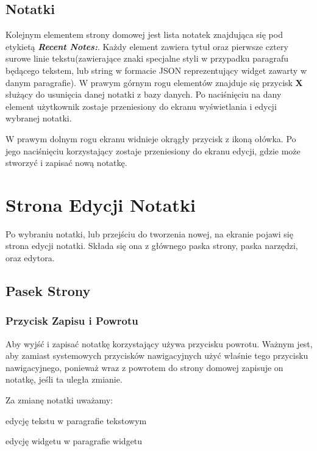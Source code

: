 \documentclass[shortabstract]{iithesis}
\begin{document}
\subsection{Notatki}

Kolejnym elementem strony domowej jest lista notatek znajdująca się pod etykietą \textbf{\textit{Recent Notes:}}. Każdy element zawiera tytuł oraz pierwsze cztery surowe linie tekstu(zawierające znaki specjalne styli w przypadku paragrafu będącego tekstem, lub string w formacie JSON reprezentujący widget zawarty w danym paragrafie).
W prawym górnym rogu elementów znajduje się przycisk \textbf{X} służący do usunięcia danej notatki z bazy danych.
Po naciśnięciu na dany element użytkownik zostaje przeniesiony do ekranu wyświetlania i edycji wybranej notatki.

W prawym dolnym rogu ekranu widnieje okrągły przycisk z ikoną ołówka.
Po jego naciśnięciu korzystający zostaje przeniesiony do ekranu edycji, gdzie może stworzyć i zapisać nową notatkę.

\section{Strona Edycji Notatki}

Po wybraniu notatki, lub przejściu do tworzenia nowej, na ekranie pojawi się strona edycji notatki. Składa się ona z głównego paska strony, paska narzędzi, oraz edytora.
\subsection{Pasek Strony}

\subsubsection{Przycisk Zapisu i Powrotu}

Aby wyjść i zapisać notatkę korzystający używa przycisku powrotu.
Ważnym jest, aby zamiast systemowych przycisków nawigacyjnych użyć właśnie tego przycisku nawigacyjnego, ponieważ wraz z powrotem do strony domowej zapisuje on notatkę, jeśli ta uległa zmianie.

Za zmianę notatki uważamy:

\begin{compactitem}
    \item edycję tekstu w paragrafie tekstowym
    \item edycję widgetu w paragrafie widgetu
\end{compactitem}
\vspace{5mm}
\end{document}
